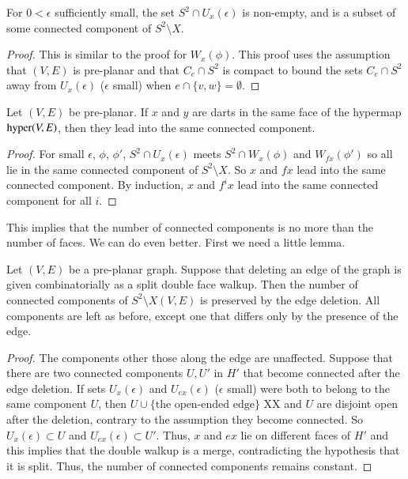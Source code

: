 \begin{lemma}
For $0<\epsilon$ sufficiently small, the set $S^2\cap U_x(\epsilon)$
is non-empty, and is a subset of some connected component of
$S^2\setminus X$.
\end{lemma}

\begin{proof} This is similar to the proof  for $W_x(\phi)$.  This
proof uses the assumption that $(V,E)$ is pre-planar and that
$C_e\cap S^2$ is compact to bound the sets $C_e\cap S^2$ away from
$U_x(\epsilon)$ ($\epsilon$ small) when $e\cap \{v,w\} = \emptyset$.
\end{proof}

\begin{lemma} Let $(V,E)$ be pre-planar.
If $x$ and $y$ are darts in the same face of the hypermap
${\operatorname{hyper}}(V,E)$, then they lead into the same connected component.
\end{lemma}

\begin{proof}  For small $\epsilon$, $\phi$, $\phi'$,
$S^2 \cap U_x(\epsilon)$ meets $S^2\cap W_x(\phi)$ and $W_{f
x}(\phi')$ so all lie in the same connected component of
$S^2\setminus X$.  So $x$ and $f x$ lead into the same connected
component.  By induction, $x$ and $f^i x$ lead into the same
connected component for all $i$.
\end{proof}

This implies that the number of connected components is no more than
the number of faces.  We can do even better.  First we need a little
lemma.

\begin{lemma} Let $(V,E)$ be a pre-planar graph.  Suppose that
deleting an edge of the graph is given combinatorially as a split
double face walkup.  Then the number of connected components of
$S^2\setminus X(V,E)$ is preserved by the edge deletion.  All
components are left as before, except one that differs only by the
presence of the edge.
\end{lemma}

\begin{proof}
The components other those along the edge are unaffected. Suppose
that there are two connected components $U,U'$ in $H'$ that become
connected after the edge deletion.  If sets $U_x(\epsilon)$ and
$U_{e x}(\epsilon)$  ($\epsilon$ small) were both to belong to the
same component $U$, then $U\cup\{\text{the open-ended edge}\}$ XX
and $U$ are disjoint open after the deletion, contrary to the
assumption they become connected.  So $U_x(\epsilon) \subset U$ and
$U_{e x}(\epsilon) \subset U'$.  Thus, $x$ and $e x$ lie on
different faces of $H'$ and this implies that the double walkup is a
merge, contradicting the hypothesis that it is split. Thus, the
number of connected components remains constant.
\end{proof}

